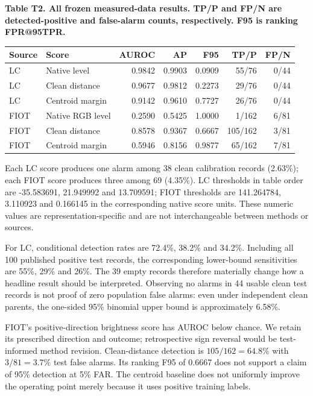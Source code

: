 \documentclass[
  10pt,
]{article}
\begin{document}
\textbf{Table T2. All frozen measured-data results. TP/P and FP/N are
detected-positive and false-alarm counts, respectively. F95 is ranking
FPR@95TPR.}

\begin{longtable}[]{@{}llrrrrr@{}}
\toprule\noalign{}
Source & Score & AUROC & AP & F95 & TP/P & FP/N \\
\midrule\noalign{}
\endhead
\bottomrule\noalign{}
\endlastfoot
LC & Native level & 0.9842 & 0.9903 & 0.0909 & 55/76 & 0/44 \\
LC & Clean distance & 0.9677 & 0.9812 & 0.2273 & 29/76 & 0/44 \\
LC & Centroid margin & 0.9142 & 0.9610 & 0.7727 & 26/76 & 0/44 \\
FIOT & Native RGB level & 0.2590 & 0.5425 & 1.0000 & 1/162 & 6/81 \\
FIOT & Clean distance & 0.8578 & 0.9367 & 0.6667 & 105/162 & 3/81 \\
FIOT & Centroid margin & 0.5946 & 0.8156 & 0.9877 & 65/162 & 7/81 \\
\end{longtable}

Each LC score produces one alarm among 38 clean calibration records
(2.63\%); each FIOT score produces three among 69 (4.35\%). LC
thresholds in table order are -35.583691, 21.949992 and 13.709591; FIOT
thresholds are 141.264784, 3.110923 and 0.166145 in the corresponding
native score units. These numeric values are representation-specific and
are not interchangeable between methods or sources.

For LC, conditional detection rates are 72.4\%, 38.2\% and 34.2\%.
Including all 100 published positive test records, the corresponding
lower-bound sensitivities are 55\%, 29\% and 26\%. The 39 empty records
therefore materially change how a headline result should be interpreted.
Observing no alarms in 44 usable clean test records is not proof of zero
population false alarms: even under independent clean parents, the
one-sided 95\% binomial upper bound is approximately 6.58\%.

FIOT's positive-direction brightness score has AUROC below chance. We
retain its prescribed direction and outcome; retrospective sign reversal
would be test-informed method revision. Clean-distance detection is
\(105/162=64.8\%\) with \(3/81=3.7\%\) test false alarms. Its ranking
F95 of 0.6667 does not support a claim of 95\% detection at 5\% FAR. The
centroid baseline does not uniformly improve the operating point merely
because it uses positive training labels.
\end{document}
